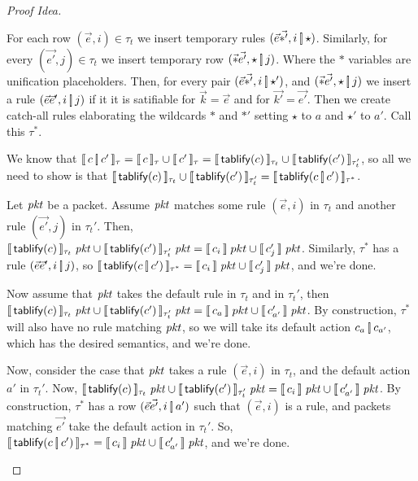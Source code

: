 \begin{proof}[Proof Idea]
\begin{enumerate}[align=left]
    For each row $(\vec e, i) \in \tau_t$ we insert temporary rules
    $(\vec e\vec{\ast'}, i \operatorname*{\left[\!\right]} \star)$. Similarly, for every
    $(\vec {e'}, j) \in \tau_t$ we insert temporary row
    $(\vec \ast \vec{e'}, \star \operatorname*{\left[\!\right]} j)$. Where the $\ast$ variables
    are unification placeholders. Then, for every pair
    $(\vec e\vec{\ast'}, i \operatorname*{\left[\!\right]} \star')$, and $(\vec \ast \vec{e'}, \star
    \operatorname*{\left[\!\right]} j)$ we insert a rule $(\vec e\vec e', i \operatorname*{\left[\!\right]} j)$ if it it
    is satifiable for $\vec k = \vec e$ and for
    $\vec {k'} = \vec {e'}$. Then we create catch-all rules
    elaborating the wildcards $\ast$ and $\ast'$ setting $\star$ to
    $a$ and $\star'$ to $a'$. Call this $\tau^\ast$.

    We know that
    $\llbracket\, c \operatorname*{\left[\!\right]} c'\,\rrbracket_{\tau} = \llbracket\,c\,\rrbracket_\tau \cup \llbracket\,c'\,\rrbracket_\tau
    = \llbracket\,\mathsf{tablify}{(c)}\,\rrbracket_{\tau_t} \cup
    \llbracket\,\mathsf{tablify}{(c')}\,\rrbracket_{\tau_t'}$, so all we need to show is that
    $\llbracket\,\mathsf{tablify}{(c)}\,\rrbracket_{\tau_t} \cup
    \llbracket\,\mathsf{tablify}{(c')}\,\rrbracket_{\tau_t'} = \llbracket\,\mathsf{tablify}{(c \operatorname*{\left[\!\right]}
        c')}\,\rrbracket_{\tau^\ast}$.

    Let $\mathit{pkt}$ be a packet. Assume $\mathit{pkt}$ matches some rule
    $(\vec{e}, i)$ in $\tau_t$ and another rule $(\vec{e'}, j)$ in
    $\tau_t'$. Then,
    $\llbracket\,\mathsf{tablify}{(c)}\,\rrbracket_{\tau_t}\; \mathit{pkt} \cup
    \llbracket\,\mathsf{tablify}{(c')}\,\rrbracket_{\tau_t'}\;\mathit{pkt} = \llbracket\,c_i\,\rrbracket\; pkt \cup
    \llbracket\,c'_j\,\rrbracket\; \mathit{pkt}$. Similarly, $\tau^\ast$ has a rule
    $(\vec e\vec e', i \operatorname*{\left[\!\right]} j)$, so
    $\llbracket\,\mathsf{tablify}{(c \operatorname*{\left[\!\right]} c')}\,\rrbracket_{\tau^\ast} = \llbracket\,c_i\,\rrbracket\; \mathit{pkt}
\cup \llbracket\,c'_j\,\rrbracket\;\mathit{pkt}$, and we're done.

    Now assume that $\mathit{pkt}$ takes the default rule in $\tau_t$ and in
    $\tau_t'$, then
    $\llbracket\,\mathsf{tablify}{(c)}\,\rrbracket_{\tau_t}\; \mathit{pkt} \cup
    \llbracket\,\mathsf{tablify}{(c')}\,\rrbracket_{\tau_t'}\;\mathit{pkt} = \llbracket\,c_a\,\rrbracket\; pkt \cup
    \llbracket\,c'_{a'}\,\rrbracket\; \mathit{pkt}$. By construction, $\tau^*$ will also have
    no rule matching $\mathit{pkt}$, so we will take its default action
    $c_a \operatorname*{\left[\!\right]} c_{a'}$, which has the desired semantics, and we're
    done.

    Now, consider the case that $\mathit{pkt}$ takes a rule $(\vec{e}, i)$ in
    $\tau_t$, and the default action $a'$ in $\tau_t'$. Now,
    $\llbracket\,\mathsf{tablify}{(c)}\,\rrbracket_{\tau_t}\; \mathit{pkt} \cup
    \llbracket\,\mathsf{tablify}{(c')}\,\rrbracket_{\tau_t'}\;\mathit{pkt} = \llbracket\,c_i\,\rrbracket\; \mathit{pkt} \cup
    \llbracket\,c'_{a'}\,\rrbracket\; \mathit{pkt}$. By construction, $\tau^\ast$ has a row
    $(\vec{e}\vec{e'}, i \operatorname*{\left[\!\right]} a')$ such that $(\vec{e},i)$ is a
    rule, and packets matching $\vec{e'}$ take the default action in
    $\tau_t'$. So,
    $\llbracket\,\mathsf{tablify}{(c \operatorname*{\left[\!\right]} c')}\,\rrbracket_{\tau^\ast} = \llbracket\,c_i\,\rrbracket\; \mathit{pkt}
    \cup \llbracket\,c'_{a'}\,\rrbracket\;\mathit{pkt}$, and we're done.
    
    
  \end{enumerate}
\end{proof}


